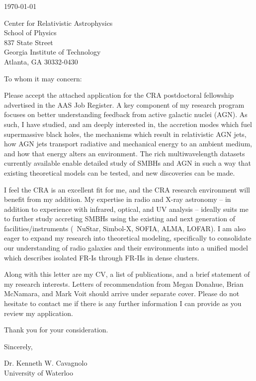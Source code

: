 \documentclass[12pt]{article}
\begin{document}
\today

Center for Relativistic Astrophysics\\
School of Physics\\
837 State Street\\
Georgia Institute of Technology\\
Atlanta, GA 30332-0430

To whom it may concern:

Please accept the attached application for the CRA postdoctoral
fellowship advertised in the AAS Job Register. A key component of my
research program focuses on better understanding feedback from active
galactic nuclei (AGN). As such, I have studied, and am deeply
interested in, the accretion modes which fuel supermassive black
holes, the mechanisms which result in relativistic AGN jets, how AGN
jets transport radiative and mechanical energy to an ambient medium,
and how that energy alters an environment. The rich multiwavelength
datasets currently available enable detailed study of SMBHs and AGN in
such a way that existing theoretical models can be tested, and new
discoveries can be made.

I feel the CRA is an excellent fit for me, and the CRA research
environment will benefit from my addition. My expertise in radio and
X-ray astronomy -- in addition to experience with infrared, optical,
and UV analysis -- ideally suits me to further study accreting SMBHs
using the existing and next generation of facilities/instruments (\ie\
NuStar, Simbol-X, SOFIA, ALMA, LOFAR). I am also eager to expand my
research into theoretical modeling, specifically to consolidate our
understanding of radio galaxies and their environments into a unified
model which describes isolated FR-Is through FR-IIs in dense clusters.

Along with this letter are my CV, a list of publications, and a brief
statement of my research interests. Letters of recommendation from
Megan Donahue, Brian McNamara, and Mark Voit should arrive under
separate cover. Please do not hesitate to contact me if there is any
further information I can provide as you review my application.

Thank you for your consideration.

Sincerely,\\
\begin{minipage}{7.5in}
\end{minipage}
Dr. Kenneth W. Cavagnolo\\
University of Waterloo
\end{document}

